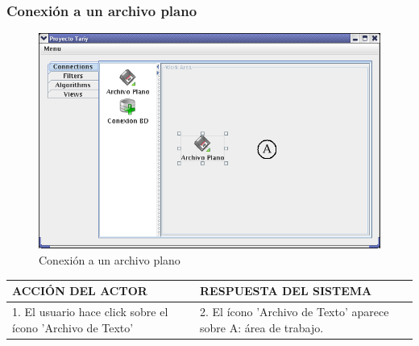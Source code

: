 \subsubsection{Conexi\'on a un archivo plano}
\begin{figure}[ht]
\centering
\includegraphics[width=1\textwidth]{images/05.png}
\caption{Conexi\'on a un archivo plano}
\end{figure}
\begin{center}
\begin{tabular}{|p{60mm}|p{60mm}|} \hline
ACCI\'ON DEL ACTOR & RESPUESTA DEL SISTEMA \\ \hline
1. El usuario hace click sobre el \'icono 'Archivo de Texto' & 2. El \'icono 'Archivo de Texto' aparece sobre A: \'area de trabajo.\\ \hline
\end{tabular}
\end{center}

\newpage
